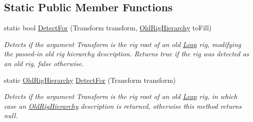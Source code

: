 \subsection*{Static Public Member Functions}
\begin{DoxyCompactItemize}
\item 
static bool \mbox{\hyperlink{class_leap_1_1_unity_1_1_old_rig_hierarchy_a494d91a3cb9d07875a4c4b50c75598fd}{Detect\+For}} (Transform transform, \mbox{\hyperlink{class_leap_1_1_unity_1_1_old_rig_hierarchy}{Old\+Rig\+Hierarchy}} to\+Fill)
\begin{DoxyCompactList}\small\item\em Detects if the argument Transform is the {\itshape rig root} of an old \mbox{\hyperlink{namespace_leap_1_1_unity_1_1_leap}{Leap}} rig, modifying the passed-\/in old rig hierarchy description. Returns true if the rig was detected as an old rig, false otherwise. \end{DoxyCompactList}\item 
static \mbox{\hyperlink{class_leap_1_1_unity_1_1_old_rig_hierarchy}{Old\+Rig\+Hierarchy}} \mbox{\hyperlink{class_leap_1_1_unity_1_1_old_rig_hierarchy_a07e5376d38915dc8ad63759188cc57e8}{Detect\+For}} (Transform transform)
\begin{DoxyCompactList}\small\item\em Detects if the argument Transform is the {\itshape rig root} of an old \mbox{\hyperlink{namespace_leap_1_1_unity_1_1_leap}{Leap}} rig, in which case an \mbox{\hyperlink{class_leap_1_1_unity_1_1_old_rig_hierarchy}{Old\+Rig\+Hierarchy}} description is returned, otherwise this method returns null. \end{DoxyCompactList}\end{DoxyCompactItemize}
